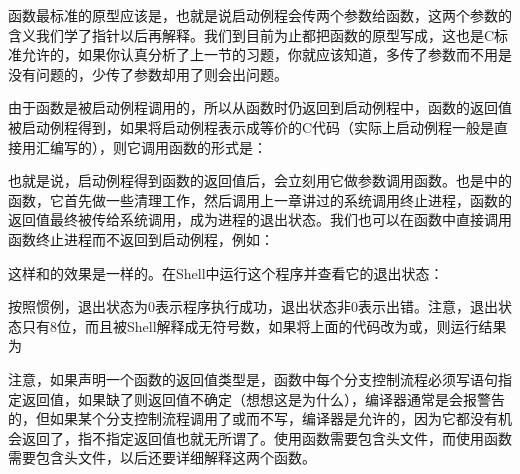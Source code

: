 函数最标准的原型应该是，也就是说启动例程会传两个参数给函数，这两个参数的含义我们学了指针以后再解释。我们到目前为止都把函数的原型写成，这也是C标准允许的，如果你认真分析了上一节的习题，你就应该知道，多传了参数而不用是没有问题的，少传了参数却用了则会出问题。



由于函数是被启动例程调用的，所以从函数时仍返回到启动例程中，函数的返回值被启动例程得到，如果将启动例程表示成等价的C代码（实际上启动例程一般是直接用汇编写的），则它调用函数的形式是：




也就是说，启动例程得到函数的返回值后，会立刻用它做参数调用函数。也是中的函数，它首先做一些清理工作，然后调用上一章讲过的系统调用终止进程，函数的返回值最终被传给系统调用，成为进程的退出状态。我们也可以在函数中直接调用函数终止进程而不返回到启动例程，例如：




这样和的效果是一样的。在Shell中运行这个程序并查看它的退出状态：




按照惯例，退出状态为0表示程序执行成功，退出状态非0表示出错。注意，退出状态只有8位，而且被Shell解释成无符号数，如果将上面的代码改为或，则运行结果为




注意，如果声明一个函数的返回值类型是，函数中每个分支控制流程必须写语句指定返回值，如果缺了则返回值不确定（想想这是为什么），编译器通常是会报警告的，但如果某个分支控制流程调用了或而不写，编译器是允许的，因为它都没有机会返回了，指不指定返回值也就无所谓了。使用函数需要包含头文件，而使用函数需要包含头文件，以后还要详细解释这两个函数。

